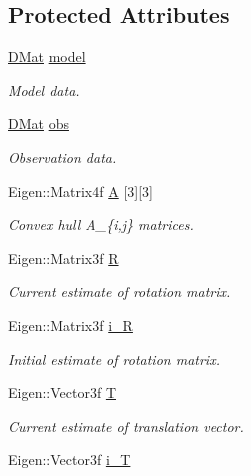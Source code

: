 \subsection*{\-Protected \-Attributes}
\begin{DoxyCompactItemize}
\item 
\hyperlink{common_8h_a4ec92c19d079ab17709ca464cfb8e5bd}{\-D\-Mat} \hyperlink{classPoseEstimate_aca9217cfe0d272f172f65adfc31764f1}{model}
\begin{DoxyCompactList}\small\item\em \-Model data. \end{DoxyCompactList}\item 
\hyperlink{common_8h_a4ec92c19d079ab17709ca464cfb8e5bd}{\-D\-Mat} \hyperlink{classPoseEstimate_a75beb14fe9fd10fc8a80eff84f348c1c}{obs}
\begin{DoxyCompactList}\small\item\em \-Observation data. \end{DoxyCompactList}\item 
\-Eigen\-::\-Matrix4f \hyperlink{classPoseEstimate_ad4827d1aca3b4730d6e8c0cf4e96deca}{\-A} \mbox{[}3\mbox{]}\mbox{[}3\mbox{]}
\begin{DoxyCompactList}\small\item\em \-Convex hull \-A\-\_\-\{i,j\} matrices. \end{DoxyCompactList}\item 
\-Eigen\-::\-Matrix3f \hyperlink{classPoseEstimate_a45910f753f4c92260252d965af504cc8}{\-R}
\begin{DoxyCompactList}\small\item\em \-Current estimate of rotation matrix. \end{DoxyCompactList}\item 
\-Eigen\-::\-Matrix3f \hyperlink{classPoseEstimate_ac6b2c23e4121d00a14d4a8245cad86ab}{i\-\_\-\-R}
\begin{DoxyCompactList}\small\item\em \-Initial estimate of rotation matrix. \end{DoxyCompactList}\item 
\-Eigen\-::\-Vector3f \hyperlink{classPoseEstimate_a31a1a39ab75efc08a00ddc8f8f75b60b}{\-T}
\begin{DoxyCompactList}\small\item\em \-Current estimate of translation vector. \end{DoxyCompactList}\item 
\-Eigen\-::\-Vector3f \hyperlink{classPoseEstimate_a0fa85e3f7cd2b447df9985519a28c0d7}{i\-\_\-\-T}

\end{DoxyCompactItemize}
